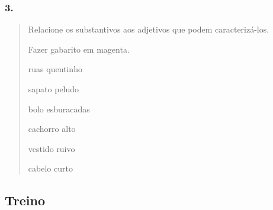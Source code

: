 \subsubsection{3. }\label{section-59}

\begin{quote}
Relacione os substantivos aos adjetivos que podem caracterizá-los.

Fazer gabarito em magenta.

ruas quentinho

sapato peludo

bolo esburacadas

cachorro alto

vestido ruivo

cabelo curto
\end{quote}

\subsection{Treino}\label{treino-6}

